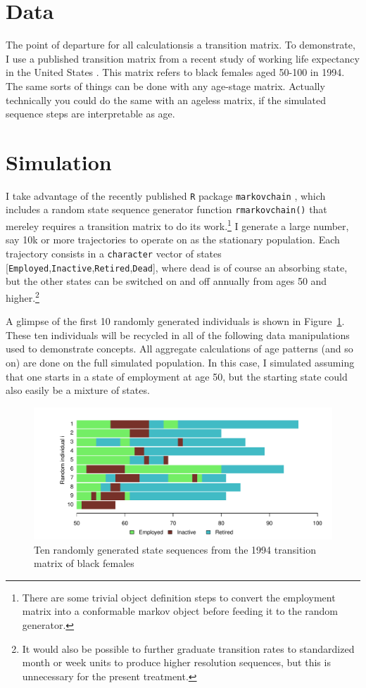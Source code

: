 \documentclass{article}
\begin{document}
\section{Data}
The point of departure for all calculationsis a
transition matrix. To demonstrate, I use a published transition matrix from a recent
study of working life expectancy in the United States \citep{Dudel2017}. This
matrix refers to black females aged 50-100 in 1994. The same sorts of things can
be done with any age-stage matrix. Actually technically you could do the same with
an ageless matrix, if the simulated sequence steps are interpretable as age.

\section{Simulation}
I take advantage of the recently published \texttt{R} package
\texttt{markovchain} \citep{spedicato2017}, which includes a random state
sequence generator function \texttt{rmarkovchain()} that mereley requires a
transition matrix to do its work.\footnote{There are some trivial object
definition steps to convert the employment matrix into a conformable markov
object before feeding it to the random generator.} I generate a large number,
say 10k or more trajectories to operate on as the stationary population. Each
trajectory consists in a \texttt{character} vector of states
[\texttt{Employed},\texttt{Inactive},\texttt{Retired},\texttt{Dead}], where dead
is of course an absorbing state, but the other states can be switched on and off
annually from ages 50 and higher.\footnote{It would also be possible to further
graduate transition rates to standardized month or week units to produce higher
resolution sequences, but this is unnecessary for the present treatment.}

A glimpse of the first 10 randomly generated individuals is shown in
Figure~\ref{fig:seq10}. These ten individuals will be recycled in all of the
following data manipulations used to demonstrate concepts. All aggregate
calculations of age patterns (and so on) are done on the full simulated population. In this case, I simulated
assuming that one starts in a state of employment at age 50, but the starting
state could also easily be a mixture of states.

\begin{figure}[ht!]
\centering
\caption{Ten randomly generated state sequences from the 1994 transition matrix
of black females \citep{Dudel2017}}
\label{fig:seq10}
\includegraphics[scale=.6]{Figures/Seq10.pdf}
\end{figure}
\end{document}
